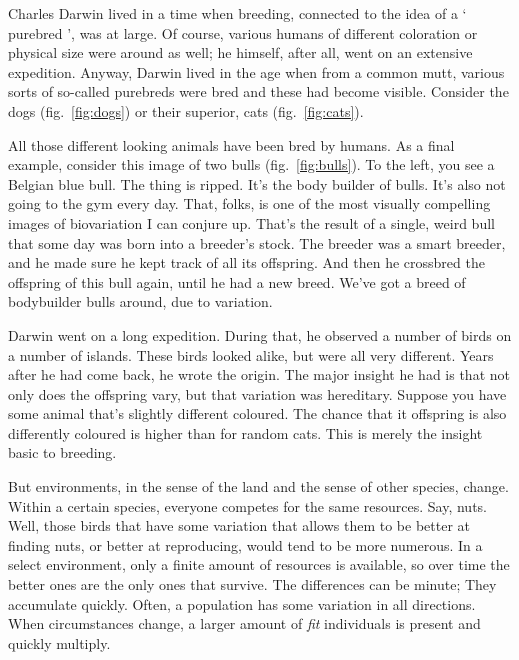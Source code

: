 \begin{multicols}{2}
Charles Darwin lived in a time when breeding, connected to the idea of a ‘ purebred ’, was at large. Of course, various humans of different coloration or physical size were around as well; he himself, after all, went on an extensive expedition. Anyway, Darwin lived in the age when from a common mutt, various sorts of so-called purebreds were bred and these had become visible. Consider the dogs (fig.~\ref{fig:dogs}) or their superior, cats  (fig.~\ref{fig:cats}). 


All those different looking animals have been bred by humans. As a final example, consider this image of two bulls (fig.~\ref{fig:bulls}). To the left, you see a Belgian blue bull. The thing is ripped. It's the body builder of bulls. It's also not going to the gym every day. That, folks, is one of the most visually compelling images of biovariation I can conjure up. That's the result of a single, weird bull that some day was born into a breeder's stock. The breeder was a smart breeder, and he made sure he kept track of all its offspring. And then he crossbred the offspring of this bull again, until he had a new breed. We've got a breed of bodybuilder bulls around, due to variation.


Darwin went on a long expedition. During that, he observed a number of birds on a number of islands. These birds looked alike, but were all very different. Years after he had come back, he wrote the origin. The major insight he had is that not only does the offspring vary, but that variation was hereditary. Suppose you have some animal that's slightly different coloured. The chance that it offspring is also differently coloured is higher than for random cats. This is merely the insight basic to breeding.

But environments, in the sense of the land and the sense of other species, change. Within a certain species, everyone competes for the same resources. Say, nuts. Well, those birds that have some variation that allows them to be better at finding nuts, or better at reproducing, would tend to be more numerous. In a select environment, only a finite amount of resources is available, so over time the better ones are the only ones that survive. The differences can be minute; They accumulate quickly. Often, a population has some variation in all directions. When circumstances change, a larger amount of \emph{fit} individuals is present and quickly multiply.


\end{multicols}
